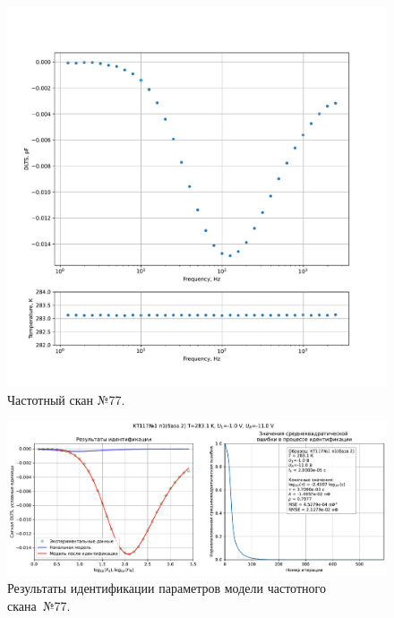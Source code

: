 \begin{figure}[!ht]
    \centering
    \includegraphics[width=1\textwidth]{../plots/КТ117№1_п1(база 2)_2500Гц-1Гц_1пФ_+10С_-1В-11В_200мВ_20мкс_шаг_0,1.pdf}
    \caption{Частотный скан №77.}
    \label{pic:frequency_scan_77}
\end{figure}

\begin{figure}[!ht]
    \centering
    \includegraphics[width=1\textwidth]{../plots/КТ117№1_п1(база 2)_2500Гц-1Гц_1пФ_+10С_-1В-11В_200мВ_20мкс_шаг_0,1_model.pdf}
    \caption{Результаты идентификации параметров модели частотного скана~№77.}
    \label{pic:frequency_scan_model77}
\end{figure}

\pagebreak


